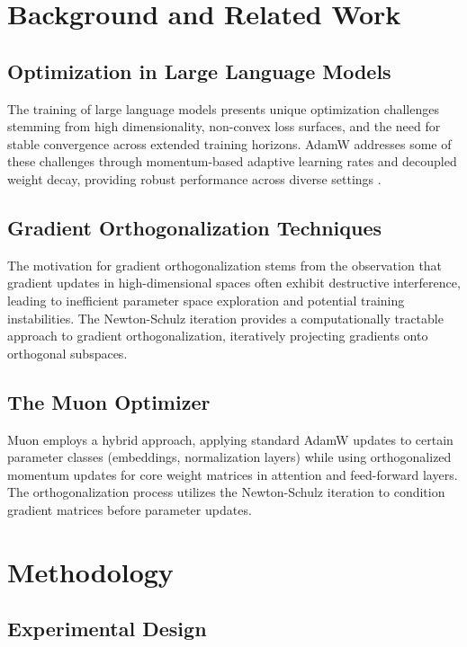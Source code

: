 \documentclass[11pt,a4paper]{article}
\begin{document}
\section{Background and Related Work}

\subsection{Optimization in Large Language Models}

The training of large language models presents unique optimization challenges stemming from high dimensionality, non-convex loss surfaces, and the need for stable convergence across extended training horizons. AdamW addresses some of these challenges through momentum-based adaptive learning rates and decoupled weight decay, providing robust performance across diverse settings \cite{loshchilov2017decoupled}.

\subsection{Gradient Orthogonalization Techniques}

The motivation for gradient orthogonalization stems from the observation that gradient updates in high-dimensional spaces often exhibit destructive interference, leading to inefficient parameter space exploration and potential training instabilities. The Newton-Schulz iteration provides a computationally tractable approach to gradient orthogonalization, iteratively projecting gradients onto orthogonal subspaces.

\subsection{The Muon Optimizer}

Muon employs a hybrid approach, applying standard AdamW updates to certain parameter classes (embeddings, normalization layers) while using orthogonalized momentum updates for core weight matrices in attention and feed-forward layers. The orthogonalization process utilizes the Newton-Schulz iteration to condition gradient matrices before parameter updates.

\section{Methodology}

\subsection{Experimental Design}
\end{document}
